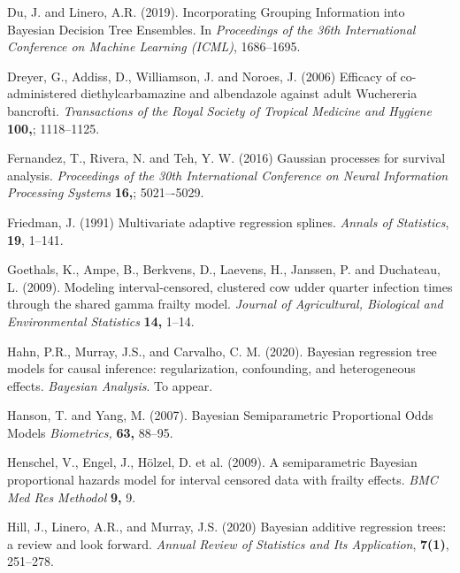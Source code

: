 \documentclass[11pt]{article}
\begin{document}
\begin{thebibliography}{}
\bibitem{ } Du, J. and Linero, A.R. (2019). Incorporating Grouping Information into Bayesian Decision Tree Ensembles. In \emph{Proceedings of the 36th International
Conference on Machine Learning (ICML)}, 1686--1695.

	
\bibitem{ }	Dreyer, G., Addiss, D., Williamson, J. and Noroes, J. (2006) Efficacy of co-administered diethylcarbamazine and albendazole against adult Wuchereria bancrofti. \textit{Transactions of the Royal Society of Tropical Medicine and Hygiene} \textbf{100,}; 1118–1125.

\bibitem{ }	Fernandez, T., Rivera, N. and Teh, Y. W. (2016) Gaussian processes for survival analysis. \textit{Proceedings of the 30th International Conference on Neural Information Processing Systems} \textbf{16,}; 5021–-5029.

\bibitem{ } Friedman, J. (1991) Multivariate adaptive regression splines. \textit{Annals of Statistics}, \textbf{19}, 1--141.


\bibitem{ } Goethals, K., Ampe, B., Berkvens, D., Laevens, H., Janssen, P. and Duchateau, L. (2009). Modeling interval-censored, clustered cow udder quarter infection times through the shared gamma frailty model. \textit{Journal of Agricultural, Biological and Environmental Statistics} \textbf{14,} 1--14.	

\bibitem{ } Hahn, P.R., Murray, J.S., and Carvalho, C. M. (2020). Bayesian regression tree models for causal inference: regularization, confounding, and heterogeneous effects. \textit{Bayesian Analysis}. To appear.

\bibitem{ }	Hanson, T. and Yang, M. (2007). Bayesian Semiparametric Proportional Odds Models \textit{Biometrics,} \textbf{63,} 88--95.

\bibitem{ } Henschel, V., Engel, J., Hölzel, D. et al. (2009). A semiparametric Bayesian proportional hazards model for interval censored data with frailty effects.\textit{ BMC Med Res Methodol} \textbf{9,} 9.
	
\bibitem{ } Hill, J., Linero, A.R., and Murray, J.S. (2020) Bayesian additive regression trees: a review and look forward. \textit{Annual Review of Statistics and Its Application}, \textbf{7(1)}, 251--278.
	
	

\end{thebibliography}
\end{document}
